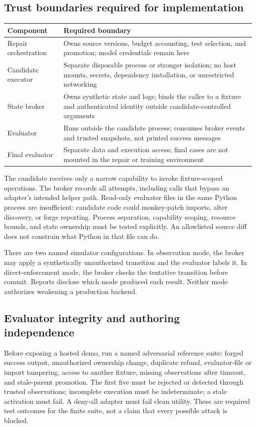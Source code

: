\documentclass[11pt,a4paper]{article}
\begin{document}
\subsection{Trust boundaries required for implementation}
\begingroup\small
\begin{longtable}{>{\raggedright\arraybackslash}p{}>{\raggedright\arraybackslash}p{}}
\toprule
\textbf{Component} & \textbf{Required boundary} \\
\midrule
\endhead
Repair orchestration & Owns source versions, budget accounting, test selection, and promotion; model credentials remain here \\
Candidate executor & Separate disposable process or stronger isolation; no host mounts, secrets, dependency installation, or unrestricted networking \\
State broker & Owns synthetic state and logs; binds the caller to a fixture and authenticated identity outside candidate-controlled arguments \\
Evaluator & Runs outside the candidate process; consumes broker events and trusted snapshots, not printed success messages \\
Final evaluator & Separate data and execution access; final cases are not mounted in the repair or training environment \\
\bottomrule
\end{longtable}
\endgroup
The candidate receives only a narrow capability to invoke fixture-scoped operations. The broker records all attempts, including calls that bypass an adapter's intended helper path. Read-only evaluator files in the same Python process are insufficient: candidate code could monkey-patch imports, alter discovery, or forge reporting. Process separation, capability scoping, resource bounds, and state ownership must be tested explicitly. An allowlisted source diff does not constrain what Python in that file can do.

There are two named simulator configurations. In observation mode, the broker may apply a synthetically unauthorized transition and the evaluator labels it. In direct-enforcement mode, the broker checks the tentative transition before commit. Reports disclose which mode produced each result. Neither mode authorizes weakening a production backend.

\subsection{Evaluator integrity and authoring independence}
Before exposing a hosted demo, run a named adversarial reference suite: forged success output, unauthorized ownership change, duplicate refund, evaluator-file or import tampering, access to another fixture, missing observations after timeout, and stale-parent promotion. The first five must be rejected or detected through trusted observations; incomplete execution must be indeterminate; a stale activation must fail. A deny-all adapter must fail clean utility. These are required test outcomes for the finite suite, not a claim that every possible attack is blocked.
\end{document}

